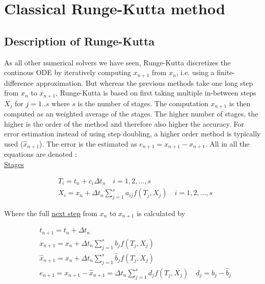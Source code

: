 \section{Classical Runge-Kutta method}

\subsection{Description of Runge-Kutta}
As all other numerical solvers we have seen, Runge-Kutta discretizes the continous ODE by iteratively computing $x_{n+1}$ from $x_n$, i.e. using a finite-difference approximation. But whereas the previous methods take one long step from $x_n$ to $x_{n+1}$, Runge-Kutta is based on first taking multiple in-between steps $X_j$ for $j=1..s$ where $s$ is the number of stages. The computation $x_{n+1}$ is then computed as an weighted average of the stages. The higher number of stages, the higher is the order of the method and therefore also higher the accuracy. For error estimation instead of using step doubling, a higher order method is typically used ($\hat{x}_{n+1}$). The error is the estimated as $e_{n+1}=x_{n+1}-\hat{x}_{n+1}$. All in all the equations are denoted \cite{JrgensenRunge-KuttaEquations}:\\
\underline{Stages}

\begin{equation}
\label{eq:RKgeneral1}
\begin{aligned}
&T_{i}=t_{n}+c_{i} \Delta t_n \quad i=1,2, \ldots, s\\
&X_{i}=x_{n}+\Delta t_n \sum_{j=1}^{s} a_{i j} f\left(T_{j}, X_{j}\right) \quad i=1,2, \ldots, s
\end{aligned}
\end{equation}

Where the full \underline{next step} from $x_n$ to $x_{n+1}$ is calculated by

\begin{equation}
\label{eq:RKgeneral2}
\begin{aligned}
&t_{n+1}=t_{n}+\Delta t_n \\
&x_{n+1}=x_{n}+\Delta t_n \sum_{j=1}^{s} b_{j} f\left(T_{j}, X_{j}\right) \\
&\hat{x}_{n+1}=x_{n}+\Delta t_n \sum_{j=1}^{s} \hat{b}_{j} f\left(T_{j}, X_{j}\right) \\
&e_{n+1}=x_{n+1}-\hat{x}_{n+1}=\Delta t_n \sum_{j=1}^{s} d_{j} f\left(T_{j}, X_{j}\right) \quad d_{j}=b_{j}-\hat{b}_{j}
\end{aligned}
\end{equation}

